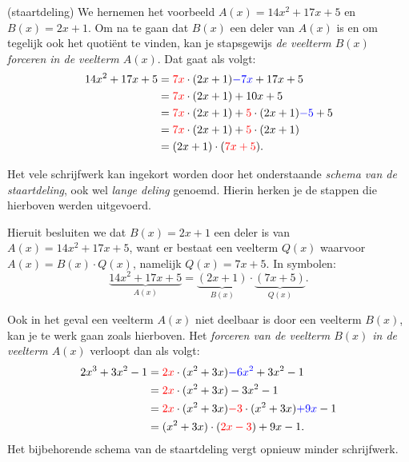 \documentclass{ximera}
\begin{document}
\begin{algorithm}(staartdeling)
	We hernemen het voorbeeld $A(x) = 14x^2+17x+5$ en $B(x) = 2x+1$. Om na te gaan dat $B(x)$ een deler van $A(x)$ is en om tegelijk ook het quotiënt te vinden, kan je stapsgewijs \textit{ de veelterm $B(x)$ forceren in de veelterm $A(x)$}. Dat gaat als volgt:
	\begin{align*}
	14x^2 + 17x + 5 
	& = {{\color{red}7x}} \cdot (2x+1) {\color{blue}- 7x} + 17x + 5 \\
	& = {\color{red}7x} \cdot (2x+1) + 10x + 5 \\
	& = {\color{red}7x} \cdot (2x+1) + {\color{red}5} \cdot (2x+1) {\color{blue}- 5} + 5 \\
	& = {\color{red}7x} \cdot (2x+1) + {\color{red}5} \cdot (2x+1) \\
	& = (2x+1)\cdot({\color{red}7x + 5}).
	\end{align*}
	
	
	
	Het vele schrijfwerk kan ingekort worden door het onderstaande \textit{ schema van de staartdeling}, ook wel \textit{ lange deling} genoemd. Hierin herken je de stappen die hierboven werden uitgevoerd. 


	Hieruit besluiten we dat $B(x) = 2x+1$ een deler is van $A(x) = 14x^2+17x+5$, want er bestaat een veelterm $Q(x)$ waarvoor $A(x) = B(x) \cdot Q(x)$, namelijk $Q(x) = 7x+5$. In symbolen:
	\[
	\underbrace{14x^2+17x+5}_{A(x)} = \underbrace{(2x+1)}_{B(x)}\cdot\underbrace{(7x + 5)}_{Q(x)}.
	\]

	Ook in het geval een veelterm $A(x)$ niet deelbaar is door een veelterm $B(x)$, kan je te werk gaan zoals hierboven. Het \textit{ forceren van de veelterm $B(x)$ in de veelterm $A(x)$} verloopt dan als volgt:
	\begin{align*}
	2x^3 + 3x^2 - 1 
	& = {\color{red}2x} \cdot (x^2+3x) {\color{blue}- 6x^2} + 3x^2 - 1 \\
	& = {\color{red}2x} \cdot (x^2+3x) - 3x^2 - 1 \\
	& = {\color{red}2x} \cdot (x^2+3x) {\color{red}- 3} \cdot (x^2+3x) {\color{blue}+ 9x} - 1  \\
	& = (x^2+3x) \cdot ({\color{red}2x - 3}) + 9x - 1.
	\end{align*}
	Het bijbehorende schema van de staartdeling vergt opnieuw minder schrijfwerk. 


\end{algorithm}
\end{document}
